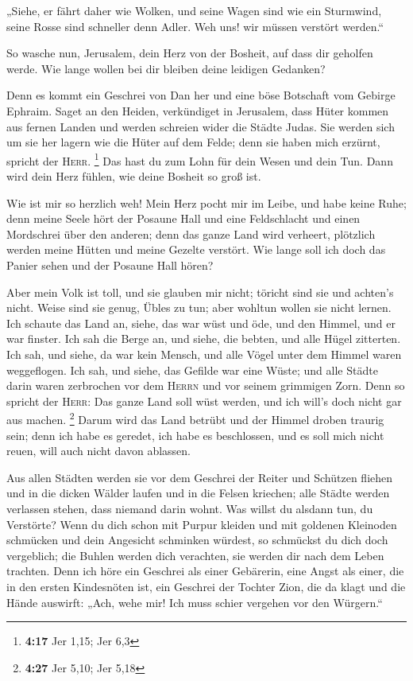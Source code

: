  „Siehe, er fährt daher wie Wolken, und seine Wagen sind
wie ein Sturmwind, seine Rosse sind schneller denn Adler. Weh uns! wir
müssen verstört werden.``

 So wasche nun, Jerusalem, dein Herz von der Bosheit, auf
dass dir geholfen werde. Wie lange wollen bei dir bleiben deine leidigen
Gedanken?

 Denn es kommt ein Geschrei von Dan her und eine böse
Botschaft vom Gebirge Ephraim.  Saget an den Heiden,
verkündiget in Jerusalem, dass Hüter kommen aus fernen Landen und werden
schreien wider die Städte Judas.  Sie werden sich um sie
her lagern wie die Hüter auf dem Felde; denn sie haben mich erzürnt,
spricht der \textsc{Herr}. \footnote{\textbf{4:17} Jer 1,15; Jer 6,3}
 Das hast du zum Lohn für dein Wesen und dein Tun. Dann
wird dein Herz fühlen, wie deine Bosheit so groß ist.

 Wie ist mir so herzlich weh! Mein Herz pocht mir im
Leibe, und habe keine Ruhe; denn meine Seele hört der Posaune Hall und
eine Feldschlacht  und einen Mordschrei über den anderen;
denn das ganze Land wird verheert, plötzlich werden meine Hütten und
meine Gezelte verstört.  Wie lange soll ich doch das
Panier sehen und der Posaune Hall hören?

 Aber mein Volk ist toll, und sie glauben mir nicht;
töricht sind sie und achten's nicht. Weise sind sie genug, Übles zu tun;
aber wohltun wollen sie nicht lernen.  Ich schaute das
Land an, siehe, das war wüst und öde, und den Himmel, und er war
finster.  Ich sah die Berge an, und siehe, die bebten,
und alle Hügel zitterten.  Ich sah, und siehe, da war
kein Mensch, und alle Vögel unter dem Himmel waren weggeflogen.
 Ich sah, und siehe, das Gefilde war eine Wüste; und alle
Städte darin waren zerbrochen vor dem \textsc{Herrn} und vor seinem
grimmigen Zorn.  Denn so spricht der \textsc{Herr}: Das
ganze Land soll wüst werden, und ich will's doch nicht gar aus machen.
\footnote{\textbf{4:27} Jer 5,10; Jer 5,18}  Darum wird
das Land betrübt und der Himmel droben traurig sein; denn ich habe es
geredet, ich habe es beschlossen, und es soll mich nicht reuen, will
auch nicht davon ablassen.

 Aus allen Städten werden sie vor dem Geschrei der Reiter
und Schützen fliehen und in die dicken Wälder laufen und in die Felsen
kriechen; alle Städte werden verlassen stehen, dass niemand darin wohnt.
 Was willst du alsdann tun, du Verstörte? Wenn du dich
schon mit Purpur kleiden und mit goldenen Kleinoden schmücken und dein
Angesicht schminken würdest, so schmückst du dich doch vergeblich; die
Buhlen werden dich verachten, sie werden dir nach dem Leben trachten.
 Denn ich höre ein Geschrei als einer Gebärerin, eine
Angst als einer, die in den ersten Kindesnöten ist, ein Geschrei der
Tochter Zion, die da klagt und die Hände auswirft: „Ach, wehe mir! Ich
muss schier vergehen vor den Würgern.``

